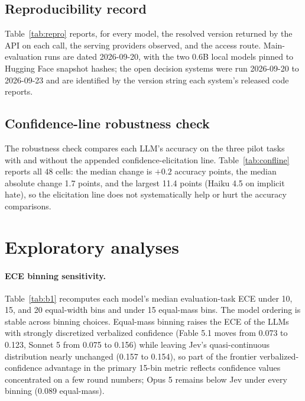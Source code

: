 \documentclass[11pt]{article}
\begin{document}
\subsection{Reproducibility record}
Table~\ref{tab:repro} reports, for every model, the resolved version returned by the API on each call, the serving providers observed, and the access route. Main-evaluation runs are dated 2026-09-20, with the two 0.6B local models pinned to Hugging Face snapshot hashes; the open decision systems were run 2026-09-20 to 2026-09-23 and are identified by the version string each system's released code reports.

{\footnotesize}

\subsection{Confidence-line robustness check}
The robustness check compares each LLM's accuracy on the three pilot tasks with and without the appended confidence-elicitation line. Table~\ref{tab:confline} reports all 48 cells: the median change is $+0.2$ accuracy points, the median absolute change 1.7 points, and the largest 11.4 points (Haiku 4.5 on implicit hate), so the elicitation line does not systematically help or hurt the accuracy comparisons.

\begin{table}[!htbp]
\centering
\caption{Robustness check: accuracy change (points, with-confidence minus without) per LLM on the three pilot tasks when the confidence-elicitation line is appended to the prompt.}
\label{tab:confline}
\small

\end{table}

\FloatBarrier
{\footnotesize\setlength{\tabcolsep}{3.5pt}}

{\small}

\clearpage
\section{Exploratory analyses}
\label{app:exploratory}

\paragraph{ECE binning sensitivity.}
Table~\ref{tab:b1} recomputes each model's median evaluation-task ECE under 10, 15, and 20 equal-width bins and under 15 equal-mass bins. The model ordering is stable across binning choices. Equal-mass binning raises the ECE of the LLMs with strongly discretized verbalized confidence (Fable 5.1 moves from 0.073 to 0.123, Sonnet 5 from 0.075 to 0.156) while leaving Jev's quasi-continuous distribution nearly unchanged (0.157 to 0.154), so part of the frontier verbalized-confidence advantage in the primary 15-bin metric reflects confidence values concentrated on a few round numbers; Opus 5 remains below Jev under every binning (0.089 equal-mass).
\end{document}
